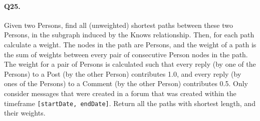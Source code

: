 \paragraph{Q25.}
Given two Persons, find all (unweighted) shortest paths between these
two Persons, in the subgraph induced by the Knows relationship.
Then, for each path calculate a weight. The nodes in the path are
Persons, and the weight of a path is the sum of weights between every
pair of consecutive Person nodes in the path.
The weight for a pair of Persons is calculated such that every reply (by
one of the Persons) to a Post (by the other Person) contributes 1.0, and
every reply (by ones of the Persons) to a Comment (by the other Person)
contributes 0.5.
Only consider messages that were created in a forum that was created
within the timeframe \texttt{{[}startDate,\ endDate{]}}.
Return all the paths with shortest length, and their weights.
